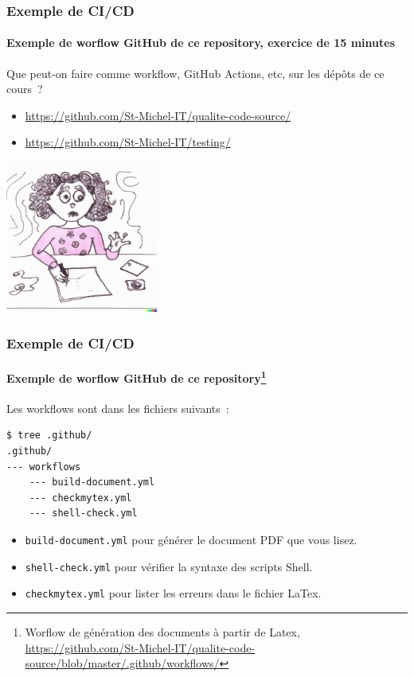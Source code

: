 \documentclass{beamer}
\begin{document}
    \begin{frame}
        \frametitle{Exemple de CI/CD}
        \framesubtitle{Exemple de worflow GitHub de ce repository, exercice de 15 minutes}
        \transdissolve
        Que peut-on faire comme workflow, GitHub Actions, etc, sur les dépôts de ce cours~?
        \begin{itemize}
            \item \url{https://github.com/St-Michel-IT/qualite-code-source/}
            \item \url{https://github.com/St-Michel-IT/testing/}
        \end{itemize}
        \bigbreak
        \centering
        \includegraphics[width=5cm]{image/young-praticing-her-homework}
    \end{frame}

    \begin{frame}[fragile]
        \frametitle{Exemple de CI/CD}
        \framesubtitle{Exemple de worflow GitHub de ce repository{\footnote{Worflow de génération des documents à partir de Latex, \url{https://github.com/St-Michel-IT/qualite-code-source/blob/master/.github/workflows/}}}}
        \transdissolve
        Les workflows sont dans les fichiers suivants~:
        \begin{lstlisting}[language=sh]
$ tree .github/
.github/
--- workflows
    --- build-document.yml
    --- checkmytex.yml
    --- shell-check.yml
        \end{lstlisting}
        \begin{itemize}
            \item \lstinline{build-document.yml} pour générer le document PDF que vous lisez.
            \item \lstinline{shell-check.yml} pour vérifier la syntaxe des scripts Shell.
            \item \lstinline{checkmytex.yml} pour lister les erreurs dans le fichier LaTex.
        \end{itemize}
    \end{frame}
\end{document}
